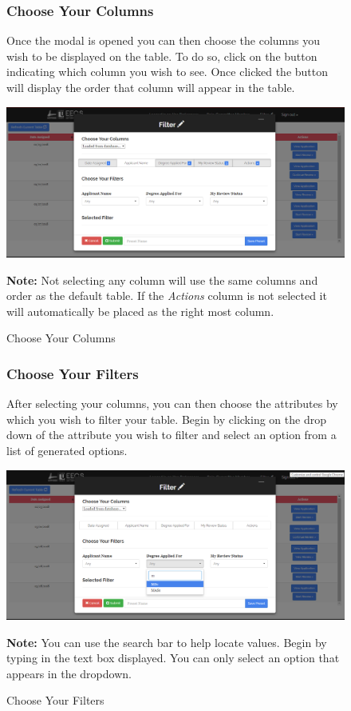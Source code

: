 \documentclass[fontsize=12pt,paper=letter,twoside]{scrartcl}
\begin{document}
\clearpage
\newpage

\begin{figure}[!htb]
\subsubsection{Choose Your Columns}
Once the modal is opened you can then choose the columns you wish to be displayed on the table. To do so, click on the button indicating which column you wish to see. Once clicked the button will display the order that column will appear in the table.\begin{center}
\includegraphics[width=.99\textwidth]{images/cm/selected_col.png}
\end{center}
\caption{Choose Your Columns}
\label{fig:cm:choose_columns}
\textbf{Note:} Not selecting any column will use the same columns and order as the default table. If the \emph{Actions} column is not selected it will automatically be placed as the right most column. 
\end{figure}

\clearpage
\begin{figure}[!htb]
\subsubsection{Choose Your Filters}
After selecting your columns, you can then choose the attributes by which you wish to filter your table. Begin by clicking on the drop down of the attribute you wish to filter and select an option from a list of generated options.
\begin{center}
\includegraphics[width=.99\textwidth]{images/cm/selected_filter.png}
\end{center}
\caption{Choose Your Filters}
\textbf{Note:} You can use the search bar to help locate values. Begin by typing in the text box displayed. You can only select an option that appears in the dropdown.
\label{fig:cm:choose_filters}
\end{figure} 
\end{document}

